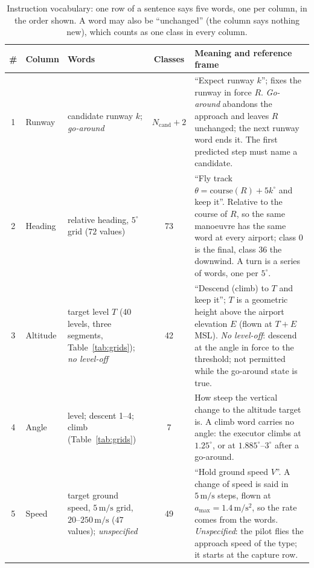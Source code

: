\begin{table}[t]
\centering
\caption{Instruction vocabulary: one row of a sentence says five words, one per column, in the order shown.
A word may also be ``unchanged'' (the column says nothing new), which counts as one class in every column.}
\label{tab:vocabulary}
\small
\renewcommand{\arraystretch}{1.25}
\begin{tabularx}{\textwidth}{@{}c l >{\raggedright\arraybackslash}p{3.9cm} c >{\raggedright\arraybackslash}X@{}}
\toprule
\# & Column & Words & Classes & Meaning and reference frame \\
\midrule
1 & Runway
  & candidate runway $k$; \emph{go-around}
  & $N_{\mathrm{cand}}+2$
  & ``Expect runway $k$''; fixes the runway in force $R$. \emph{Go-around} abandons the approach and
    leaves $R$ unchanged; the next runway word ends it. The first predicted step must name a candidate. \\
2 & Heading
  & relative heading, $5^\circ$ grid ($72$ values)
  & 73
  & ``Fly track $\theta=\mathrm{course}(R)+5k^\circ$ and keep it''. Relative to the course of $R$, so the same
    manoeuvre has the same word at every airport; class $0$ is the final, class $36$ the downwind. A turn is a series of words, one per $5^\circ$. \\
3 & Altitude
  & target level $T$ (40 levels, three segments, Table~\ref{tab:grids}); \emph{no level-off}
  & 42
  & ``Descend (climb) to $T$ and keep it''; $T$ is a geometric height above the airport elevation $E$
    (flown at $T{+}E$ MSL). \emph{No level-off}: descend at the angle in force to the threshold; not permitted while the go-around state is true. \\
4 & Angle
  & level; descent 1--4; climb (Table~\ref{tab:grids})
  & 7
  & How steep the vertical change to the altitude target is. A climb word carries no angle: the executor
    climbs at $1.25^\circ$, or at $1.885^\circ$--$3^\circ$ after a go-around. \\
5 & Speed
  & target ground speed, $5\,\mathrm{m/s}$ grid, $20$--$250\,\mathrm{m/s}$ ($47$ values); \emph{unspecified}
  & 49
  & ``Hold ground speed $V$''. A change of speed is said in $5\,\mathrm{m/s}$ steps, flown at $a_{\max}=1.4\,\mathrm{m/s^2}$,
    so the rate comes from the words. \emph{Unspecified}: the pilot flies the approach speed of the type; it starts at the capture row. \\
\bottomrule
\end{tabularx}


\end{table}
